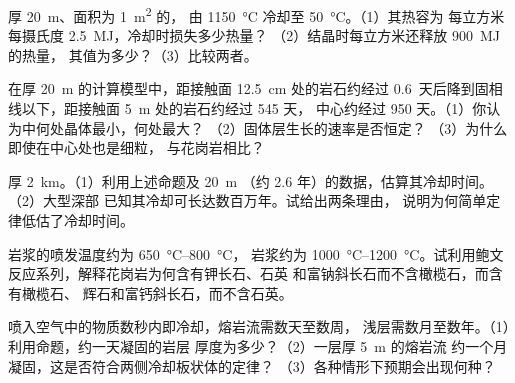 \begin{exercise}[$\star\star$]\label{exo:g11:igneous-rocks:11}
厚 \qty{20}{m}、面积为 \qty{1}{m^2} 的，
由 \qty{1150}{\degreeCelsius} 冷却至 \qty{50}{\degreeCelsius}。（1）其热容为
每立方米每摄氏度 \qty{2.5}{MJ}，冷却时损失多少热量？
（2）结晶时每立方米还释放 \qty{900}{MJ} 的热量，
其值为多少？（3）比较两者。
\end{exercise}

\begin{exercise}[$\star\star\star$]\label{exo:g11:igneous-rocks:12}
在厚 \qty{20}{m} 的计算模型中，距接触面
\qty{12.5}{cm} 处的岩石约经过
\num{0.6}~天后降到固相线以下，距接触面 \qty{5}{m} 处的岩石约经过 545 天，
中心约经过 950 天。（1）你认为中何处晶体最小，何处最大？
（2）固体层生长的速率是否恒定？
（3）为什么即使在中心处也是细粒，
与花岗岩相比？
\end{exercise}

\begin{exercise}[$\star\star\star$]\label{exo:g11:igneous-rocks:13}
厚 \qty{2}{km}。（1）利用上述命题及
\qty{20}{m} （约 2.6 年）的数据，估算其冷却时间。（2）大型深部
已知其冷却可长达数百万年。试给出两条理由，
说明为何简单定律低估了冷却时间。
\end{exercise}

\begin{exercise}[$\star\star\star$]\label{exo:g11:igneous-rocks:14}
岩浆的喷发温度约为 \qtyrange{650}{800}{\degreeCelsius}，
岩浆约为 \qtyrange{1000}{1200}{\degreeCelsius}。试利用鲍文
反应系列，解释花岗岩为何含有钾长石、石英
和富钠斜长石而不含橄榄石，而含有橄榄石、
辉石和富钙斜长石，而不含石英。
\end{exercise}

\begin{exercise}[$\star\star\star$]\label{exo:g11:igneous-rocks:15}
喷入空气中的物质数秒内即冷却，熔岩流需数天至数周，
浅层需数月至数年。（1）利用命题，约一天凝固的岩层
厚度为多少？（2）一层厚 \qty{5}{m} 的熔岩流
约一个月凝固，这是否符合两侧冷却板状体的定律？
（3）各种情形下预期会出现何种？
\end{exercise}

